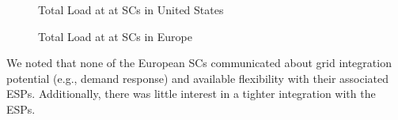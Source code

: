 \begin{figure}[ht!]
\begin{center}
\caption{Total Load at at SCs in United States}
\label{fig:USload}
\vspace{0.9cm}
\caption{Total Load at at SCs in Europe}
\label{fig:EUload}
\end{center}
\end{figure}

We noted that none of the European SCs communicated about grid integration potential (e.g., demand response) and available flexibility with their associated ESPs. Additionally, there was little interest in a tighter integration with the ESPs.

